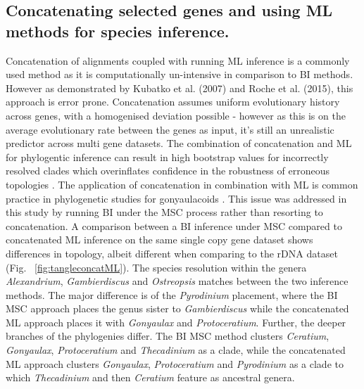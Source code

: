 \documentclass[12pt]{article}
\begin{document}
\subsection*{Concatenating selected genes and using ML methods for species inference.}
\FloatBarrier
Concatenation of alignments coupled with running ML inference is a commonly used method as it is computationally un-intensive in comparison to BI methods. 
However as demonstrated by Kubatko et al. (2007) and Roche et al. (2015), this approach is error prone. 
Concatenation assumes uniform evolutionary history across genes, with a homogenised deviation possible - however as this is on the average evolutionary rate between the genes as input, it's still an unrealistic predictor across multi gene datasets. 
The combination of concatenation and ML for phylogentic inference can result in high bootstrap values for incorrectly resolved clades which overinflates confidence in the robustness of erroneous topologies \cite{degnan2009gene}. 
The application of concatenation in combination with ML is common practice in phylogenetic studies for gonyaulacoids  \cite{shalchian2006combined,zhang2007three,saldarriaga2004molecular,murray2005improving,hoppenrath2010dinoflagellate}.
This issue was addressed in this study by running BI under the MSC process rather than resorting to concatenation. 
A comparison between a BI inference under MSC compared to concatenated ML inference on the same single copy gene dataset shows differences in topology, albeit different when comparing to the rDNA dataset (Fig. ~\ref{fig:tangleconcatML}). 
The species resolution within the genera \emph{Alexandrium}, \emph{Gambierdiscus} and \emph{Ostreopsis} matches between the two inference methods. 
The major difference is of the \emph{Pyrodinium} placement, where the BI MSC approach places the genus sister to \emph{Gambierdiscus} while the concatenated ML approach places it with \emph{Gonyaulax} and \emph{Protoceratium}. 
Further, the deeper branches of the phylogenies differ. 
The BI MSC method clusters \emph{Ceratium}, \emph{Gonyaulax}, \emph{Protoceratium} and \emph{Thecadinium} as a clade, while the concatenated ML approach clusters \emph{Gonyaulax}, \emph{Protoceratium} and \emph{Pyrodinium} as a clade to which \emph{Thecadinium} and then \emph{Ceratium} feature as ancestral genera. 
\end{document}
